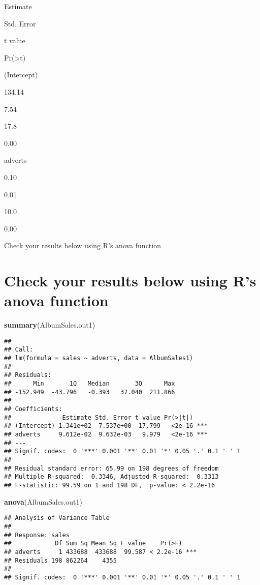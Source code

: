 \documentclass[]{article}
\newenvironment{Shaded}{\begin{snugshade}}{\end{snugshade}}
\newcommand{\KeywordTok}[1]{\textcolor[rgb]{0.13,0.29,0.53}{\textbf{#1}}}
\newcommand{\NormalTok}[1]{#1}
\begin{document}
Estimate

Std. Error

t value

Pr(\textgreater{}\textbar{}t\textbar{})

(Intercept)

134.14

7.54

17.8

0.00

adverts

0.10

0.01

10.0

0.00

Check your results below using R's anova function

\section{Check your results below using R's anova
function}\label{check-your-results-below-using-rs-anova-function}

\begin{Shaded}
\begin{Highlighting}[]
\KeywordTok{summary}\NormalTok{(AlbumSales.out1)}
\end{Highlighting}
\end{Shaded}

\begin{verbatim}
## 
## Call:
## lm(formula = sales ~ adverts, data = AlbumSales1)
## 
## Residuals:
##      Min       1Q   Median       3Q      Max 
## -152.949  -43.796   -0.393   37.040  211.866 
## 
## Coefficients:
##              Estimate Std. Error t value Pr(>|t|)    
## (Intercept) 1.341e+02  7.537e+00  17.799   <2e-16 ***
## adverts     9.612e-02  9.632e-03   9.979   <2e-16 ***
## ---
## Signif. codes:  0 '***' 0.001 '**' 0.01 '*' 0.05 '.' 0.1 ' ' 1
## 
## Residual standard error: 65.99 on 198 degrees of freedom
## Multiple R-squared:  0.3346, Adjusted R-squared:  0.3313 
## F-statistic: 99.59 on 1 and 198 DF,  p-value: < 2.2e-16
\end{verbatim}

\begin{Shaded}
\begin{Highlighting}[]
\KeywordTok{anova}\NormalTok{(AlbumSales.out1)}
\end{Highlighting}
\end{Shaded}

\begin{verbatim}
## Analysis of Variance Table
## 
## Response: sales
##            Df Sum Sq Mean Sq F value    Pr(>F)    
## adverts     1 433688  433688  99.587 < 2.2e-16 ***
## Residuals 198 862264    4355                      
## ---
## Signif. codes:  0 '***' 0.001 '**' 0.01 '*' 0.05 '.' 0.1 ' ' 1
\end{verbatim}
\end{document}
